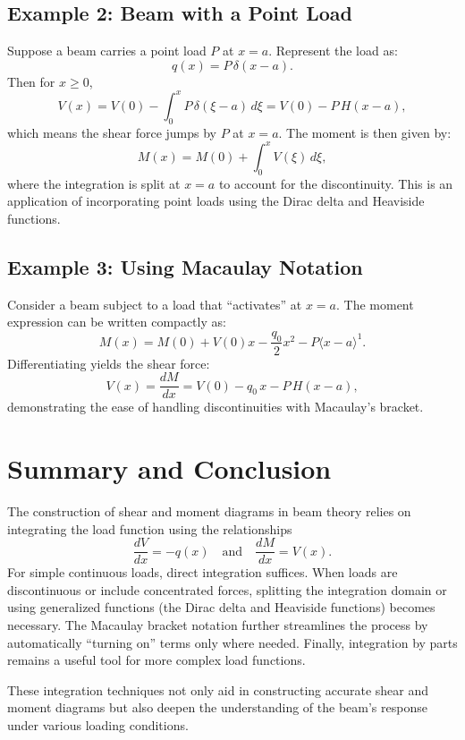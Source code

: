 \documentclass[12pt]{article}
\begin{document}
\subsection{Example 2: Beam with a Point Load}
Suppose a beam carries a point load $P$ at $x=a$. Represent the load as:
\[
q(x) = P\,\delta(x-a).
\]
Then for $x\ge 0$,
\[
V(x) = V(0) - \int_0^x P\,\delta(\xi-a)\, d\xi = V(0) - P\,H(x-a),
\]
which means the shear force jumps by $P$ at $x=a$. The moment is then given by:
\[
M(x) = M(0) + \int_0^x V(\xi)\, d\xi,
\]
where the integration is split at $x=a$ to account for the discontinuity. This is an application of incorporating point loads using the Dirac delta and Heaviside functions.

\subsection{Example 3: Using Macaulay Notation}
Consider a beam subject to a load that “activates” at $x=a$. The moment expression can be written compactly as:
\[
M(x) = M(0) + V(0)x - \frac{q_0}{2}x^2 - P\langle x - a \rangle^1.
\]
Differentiating yields the shear force:
\[
V(x) = \frac{dM}{dx} = V(0) - q_0\,x - P\,H(x-a),
\]
demonstrating the ease of handling discontinuities with Macaulay’s bracket.

\section{Summary and Conclusion}

The construction of shear and moment diagrams in beam theory relies on integrating the load function using the relationships
\[
\frac{dV}{dx} = -q(x) \quad \text{and} \quad \frac{dM}{dx} = V(x).
\]
For simple continuous loads, direct integration suffices. When loads are discontinuous or include concentrated forces, splitting the integration domain or using generalized functions (the Dirac delta and Heaviside functions) becomes necessary. The Macaulay bracket notation further streamlines the process by automatically “turning on” terms only where needed. Finally, integration by parts remains a useful tool for more complex load functions.

These integration techniques not only aid in constructing accurate shear and moment diagrams but also deepen the understanding of the beam’s response under various loading conditions.
\end{document}
